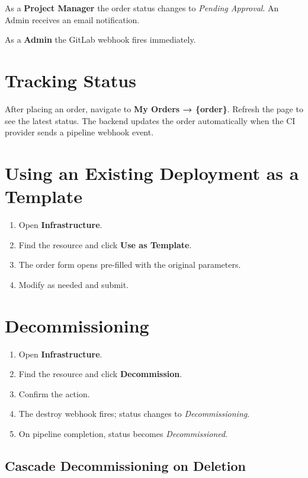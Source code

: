 \documentclass[12pt,a4paper,twoside]{report}
\newcommand{\role}[1]{\textsf{\textbf{#1}}}
\begin{document}
As a \role{Project Manager} the order status changes to
\textit{Pending Approval}. An Admin receives an email notification.

As a \role{Admin} the GitLab webhook fires immediately.

\section{Tracking Status}

After placing an order, navigate to \textbf{My Orders → \{order\}}.
Refresh the page to see the latest status. The backend updates the order
automatically when the CI provider sends a pipeline webhook event.

\section{Using an Existing Deployment as a Template}

\begin{enumerate}
  \item Open \textbf{Infrastructure}.
  \item Find the resource and click \textbf{Use as Template}.
  \item The order form opens pre-filled with the original parameters.
  \item Modify as needed and submit.
\end{enumerate}

\section{Decommissioning}
\label{sec:decommission}

\begin{enumerate}
  \item Open \textbf{Infrastructure}.
  \item Find the resource and click \textbf{Decommission}.
  \item Confirm the action.
  \item The destroy webhook fires; status changes to
        \textit{Decommissioning}.
  \item On pipeline completion, status becomes \textit{Decommissioned}.
\end{enumerate}

\subsection*{Cascade Decommissioning on Deletion}
\end{document}
